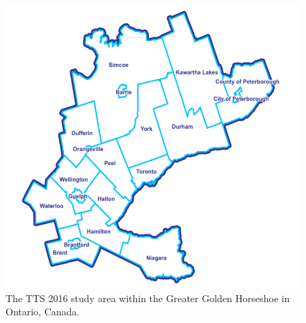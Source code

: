 \documentclass[Royal,times,sageh]{sagej}
\begin{document}
\begin{figure}

{\centering \includegraphics[width=0.8\linewidth]{images/Greater-Golden-Horseshoe-Map} 

}

\caption{\label{fig:TTS-16-survey-area}The TTS 2016 study area within the Greater Golden Horseshoe in Ontario, Canada.}\label{fig:TTS-16-survey-area}
\end{figure}
\begin{table}

\caption{\label{tab:creating-desc-stats-table}\label{tab:TTS-16-desc-stats}Descriptive statistics of the trips, workers, and jobs for the traffic analysis zones (TAZ) from the TTS 2016 dataset along with estimated car origin-destination travel times.}
\centering
{}
\end{table}
\end{document}

